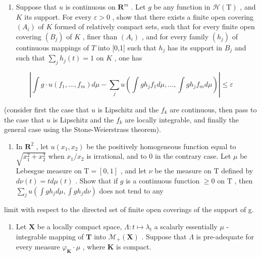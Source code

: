 \begin{enumerate}
\def\labelenumi{\alph{enumi})}
\setcounter{enumi}{2}
\tightlist
\item
  Suppose that \(u\) is continuous on \(\mathbf{R}^m\) . Let \(g\) be any function in \(\mathcal{H}(\mathrm{T})\) , and \(K\) its support. For every \(\varepsilon > 0\) , show that there exists a finite open covering \((A_i)\) of \(K\) formed of relatively compact sets, such that for every finite open covering \((B_j)\) of \(K\) , finer than \((A_i)\) , and for every family \((h_j)\) of continuous mappings of \(T\) into {[}0,1{]} such that \(h_j\) has its support in \(B_j\) and such that \(\sum_{j} h_j(t) = 1\) on \(K\) , one has
\end{enumerate}

\[
\left| \int g \cdot u (f _ {1}, \dots , f _ {m}) d \mu - \sum_ {j} u \left(\int g h _ {j} f _ {1} d \mu , \dots , \int g h _ {j} f _ {m} d \mu\right) \right| \leqslant \varepsilon
\]

(consider first the case that \(u\) is Lipschitz and the \(f_k\) are continuous, then pass to the case that \(u\) is Lipschitz and the \(f_k\) are locally integrable, and finally the general case using the Stone-Weierstrass theorem).

\begin{enumerate}
\def\labelenumi{\alph{enumi})}
\setcounter{enumi}{3}
\tightlist
\item
  In \(\mathbf{R}^2\) , let \(u(x_1, x_2)\) be the positively homogeneous function equal to \(\sqrt{x_1^2 + x_2^2}\) when \(x_1 / x_2\) is irrational, and to 0 in the contrary case. Let \(\mu\) be Lebesgue measure on \(\mathrm{T} = [0, 1]\) , and let \(\nu\) be the measure on \(\mathrm{T}\) defined by \(d\nu(t) = t d\mu(t)\) . Show that if \(g\) is a continuous function \(\geqslant 0\) on \(\mathrm{T}\) , then \(\sum_{j} u\left( \int gh_j d\mu, \int gh_j d\nu \right)\) does not tend to any
\end{enumerate}

limit with respect to the directed set of finite open coverings of the support of g.

\begin{enumerate}
\def\labelenumi{\arabic{enumi})}
\setcounter{enumi}{26}
\tightlist
\item
  Let \(\mathbf{X}\) be a locally compact space, \(\Lambda : t \mapsto \lambda_t\) a scalarly essentially \(\mu\) -integrable mapping of \(\mathbf{T}\) into \(\mathcal{M}_+(\mathbf{X})\) . Suppose that \(\Lambda\) is pre-adequate for every measure \(\varphi_{\mathbf{K}} \cdot \mu\) , where \(\mathbf{K}\) is compact.
\end{enumerate}


